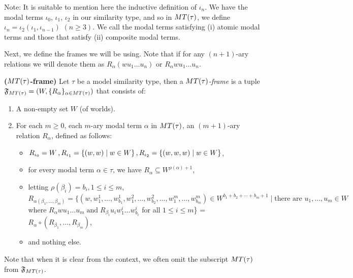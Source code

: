\par Note: It is suitable to mention here the inductive definition of $\iota_n$. We have the modal terms $\iota_0$, $\iota_1$, $\iota_2$ in our similarity type, and so in $MT(\tau)$, we define $\iota_n = \iota_2(\iota_1, \iota_{n-1})$ $(n\geq3)$. We call the modal terms satisfying (i) atomic modal terms and those that satisfy (ii) composite modal terms.
\par Next, we define the frames we will be using. Note that if for any $(n+1)$-ary relations we will denote them as $R_\alpha (wu_1\ldots u_n)$ or $R_\alpha wu_1\ldots u_n$.

\begin{definition}\label{mtt-frame}

    \textbf{($MT(\tau)$-frame)} Let $\tau$ be a model similarity type, then a \textit{$MT(\tau)$-frame} is a tuple $\mathfrak{F}_{MT(\tau)} = (W, \{ R_{\alpha} \}_{\alpha \in MT(\tau)})$ that consists of:

    \begin{enumerate}[label=(\roman*)]

        \item A non-empty set $W$ (of worlds).

        \item For each $m\geq0$, each $m$-ary modal term $\alpha$ in $MT(\tau)$, an $(m+1)$-ary relation $R_{\alpha}$, defined as follows:

        \begin{itemize}

            \item $R_{\iota_0} = W \text{\,,\,} R_{\iota_1} = \{ (w,w) \mid w \in W \} \text{\,,\,} R_{\iota_2} = \{ (w,w,w) \mid w\in W\}$,

            \item for every modal term $\alpha \in\tau$, we have $R_\alpha \subseteq W^{\rho(\alpha)+1}$,

            \item letting $\rho(\beta_i)=b_i, 1\leq i \leq m$, $R_{\alpha(\beta_1,\ldots,\beta_m)} = \{ (w, w^1_1, \ldots, w^1_{b_1}, w^2_{1},\ldots, w^2_{b_2},\ldots, w^m_{1},\ldots, w^m_{b_m}) \in W^{b_1 + b_2 + \cdots + b_m + 1} \mid \text{there } \text{are } u_1, \ldots, u_m \in W$ where $R_{\alpha}wu_1\ldots u_m\;\text{and}\;R_{\beta_i}u_iw^i_1\ldots w^i_{b_i}$ for all $1\leq i\leq m$\} = $R_\alpha\circ (R_{\beta_1},\ldots,R_{\beta_m})$, 

            \item and nothing else.

        \end{itemize}

    \end{enumerate}
    Note that when it is clear from the context, we often omit the subscript $MT(\tau)$ from $\mathfrak{F}_{MT(\tau)}$.
\end{definition}

